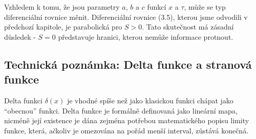 \documentclass[a4paper]{book}
\begin{document}
Vzhledem k tomu, že jsou parametry $a$, $b$ a $c$ funkcí $x$ a $\tau$, může se typ diferenciální rovnice měnit. Diferenciální rovnice (3.5), kterou jsme odvodili v předchozí kapitole, je parabolická pro $S > 0$. Tato skutečnost má zásadní důsledek - $S = 0$ představuje hranici, kterou nemůže informace protnout.

\subsection{Technická poznámka: Delta funkce a stranová funkce}

Delta funkci $\delta(x)$ je vhodné spíše než jako klasickou funkci chápat jako ``obecnou'' funkci. Delta funkce je formálně definovaná jako lineární mapa, nicméně její existence je dána zejména potřebou matematického popisu limity funkce, která, ačkoliv je omezována na pořád menší interval, zůstává konečná.
\end{document}
